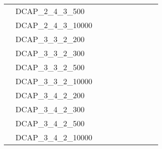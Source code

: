 \begin{table}[H]
{\begin{tabular}{llllllllll}
		& DCAP\_2\_4\_3\_500           &                           &                         &                           &                         &                           &                         &                                 &                           \\
		& DCAP\_2\_4\_3\_10000         &                           &                         &                           &                         &                           &                         &                                 &                           \\
		& DCAP\_3\_3\_2\_200           &                           &                         &                           &                         &                           &                         &                                 &                           \\
		& DCAP\_3\_3\_2\_300           &                           &                         &                           &                         &                           &                         &                                 &                           \\
		& DCAP\_3\_3\_2\_500           &                           &                         &                           &                         &                           &                         &                                 &                           \\
		& DCAP\_3\_3\_2\_10000         &                           &                         &                           &                         &                           &                         &                                 &                           \\
		& DCAP\_3\_4\_2\_200           &                           &                         &                           &                         &                           &                         &                                 &                           \\
		& DCAP\_3\_4\_2\_300           &                           &                         &                           &                         &                           &                         &                                 &                           \\
		& DCAP\_3\_4\_2\_500           &                           &                         &                           &                         &                           &                         &                                 &                           \\
		& DCAP\_3\_4\_2\_10000         &                           &                         &                           &                         &                           &                         &                                 &                           \\ \hline
	\end{tabular}
	}
\end{table}

